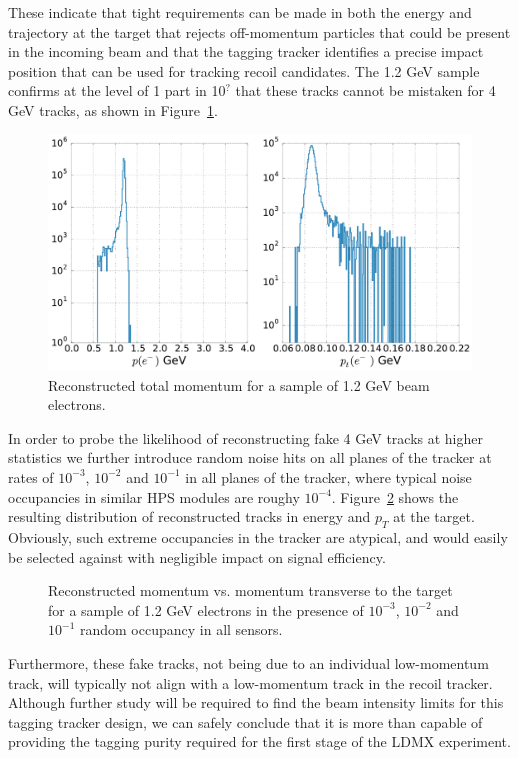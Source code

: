 These indicate that tight requirements can be made in both the energy and trajectory at the target that rejects off-momentum particles that could be present in the incoming beam and that the tagging tracker identifies a precise impact position that can be used for tracking recoil candidates.  The 1.2 GeV sample confirms at the level of 1 part in 10$^?$ that these tracks cannot be mistaken for 4 GeV tracks, as shown in Figure~\ref{fig:tracking_1pt2gev}.  
\begin{figure}[htp]
    \centering
    \includegraphics[width=\textwidth]{images/tracker/tagger_tracker_p_pt_1pt2_gev.pdf}
    \caption{\small{Reconstructed total momentum for a sample of 1.2 GeV beam 
                    electrons.}}
    \label{fig:tracking_1pt2gev}
\end{figure}
In order to probe the likelihood of reconstructing fake 4 GeV tracks at higher statistics we further introduce random noise hits on all planes of the tracker at rates of $10^{-3}$, $10^{-2}$ and $10^{-1}$ in all planes of the tracker, where typical noise occupancies in similar HPS modules are roughy $10^{-4}$. Figure~\ref{fig:tracking_1pt2gev_noise} shows the resulting distribution of reconstructed tracks in energy and $p_T$ at the target. Obviously, such extreme occupancies in the tracker are atypical, and would easily be selected against with negligible impact on signal efficiency. 
\begin{figure}[htp]
    \centering
    \caption{\small{Reconstructed momentum vs. momentum transverse to the target for a sample of 1.2 GeV electrons in the presence of $10^{-3}$, $10^{-2}$ and $10^{-1}$ random occupancy in all sensors.} }
    \label{fig:tracking_1pt2gev_noise}
\end{figure}
Furthermore, these fake tracks, not being due to an individual low-momentum track, will typically not align with a low-momentum track in the recoil tracker.  Although further study will be required to find the beam intensity limits for this tagging tracker design, we can safely conclude that it is more than capable of providing the tagging purity required for the first stage of the LDMX experiment.


